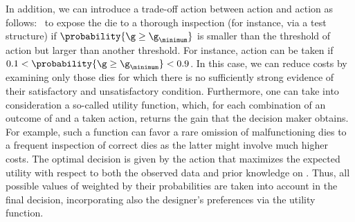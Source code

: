 In addition, we can introduce a trade-off action between action \one and action
\two as follows: \three~to expose the die to a thorough inspection (for
instance, via a test structure) if $\probability{\g \geq \g_\minimum}$ is
smaller than the threshold of action \one but larger than another threshold. For
instance, action \three can be taken if $0.1 < \probability{\g \geq \g_\minimum}
< 0.9$. In this case, we can reduce costs by examining only those dies for which
there is no sufficiently strong evidence of their satisfactory and
unsatisfactory condition. Furthermore, one can take into consideration a
so-called utility function, which, for each combination of an outcome of \g and
a taken action, returns the gain that the decision maker obtains. For example,
such a function can favor a rare omission of malfunctioning dies to a frequent
inspection of correct dies as the latter might involve much higher costs. The
optimal decision is given by the action that maximizes the expected utility with
respect to both the observed data and prior knowledge on \g. Thus, all possible
values of \g weighted by their probabilities are taken into account in the final
decision, incorporating also the designer's preferences via the utility
function.
